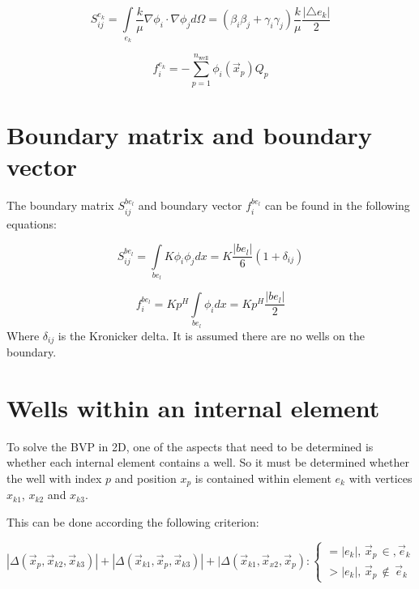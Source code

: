 \documentclass[a4paper]{report}
\begin{document}
\begin{equation}
	S^{e_k}_{ij} = \int\limits_{e_k}\frac{k}{\mu}\nabla\phi_i\cdot\nabla \phi_j d\Omega = (\beta_i\beta_j+\gamma_i\gamma_j)\frac{k}{\mu}\frac{\lvert\triangle e_k\rvert}{2}
\end{equation}

\begin{equation}\label{f_i_ek}
	f^{e_k}_i =  -\sum_{p=1}^{n_{\text{well}}}\phi_i(\vec{x}_p) Q_p
\end{equation}


\section{Boundary matrix and boundary vector}

The boundary matrix $S^{be_l}_{ij}$ and boundary vector $f^{be_l}_i$ can be found in the following equations:

\begin{equation}
	S^{be_l}_{ij} = \int\limits_{be_l} K\phi_i \phi_j dx = K\frac{\lvert be_l\rvert}{6}(1+\delta_{ij})
\end{equation}

\begin{equation}
	f^{be_l}_i = Kp^H\int\limits_{be_l}\phi_i dx = K p^H \frac{\lvert be_l\rvert}{2}
\end{equation}
Where $\delta_{ij}$ is the Kronicker delta. It is assumed there are no wells on the boundary.

\section{Wells within an internal element}

To solve the BVP in 2D, one of the aspects that need to be determined is whether each internal element contains a well. So it must be determined whether the well with index $p$ and position $x_p$ is contained within element $e_k$ with vertices $x_{k1}$, $x_{k2}$ and $x_{k3}$. 

This can be done according the following criterion:

\begin{equation}
|\Delta(\vec{x}_p,\vec{x}_{k2},\vec{x}_{k3})|+|\Delta(\vec{x}_{k1},\vec{x}_p,\vec{x}_{k3})|+|\Delta(\vec{x}_{k1},\vec{x}_{x2},\vec{x}_p):
	\begin{cases} 
	=|e_k|,\, \vec{x}_p\, \in, \vec{e}_k\\ 
	>|e_k|,\, \vec{x}_p\, \notin\,\vec{e}_k
	\end{cases} 
\end{equation}
\end{document}
